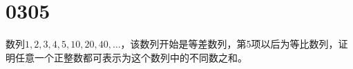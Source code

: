 \section{0305}

\begin{questions}

    \question 数列$1,2,3,4,5,10,20,40,\dots$，该数列开始是等差数列，第5项以后为等比数列，证明任意一个正整数都可表示为这个数列中的不同数之和。

    \begin{solution}
\end{solution}
\end{questions}
